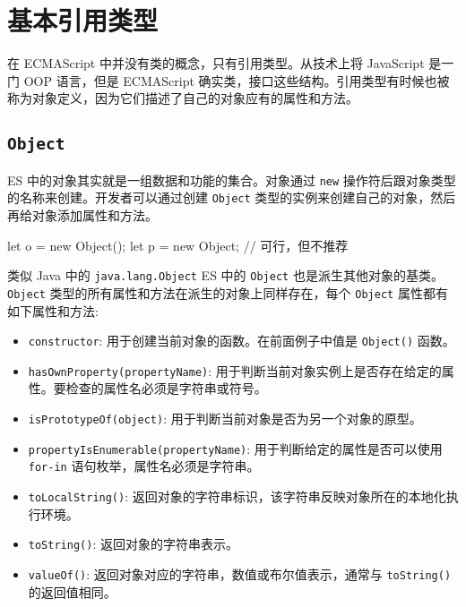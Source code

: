 \section{基本引用类型}

在 ECMAScript 中并没有类的概念，只有引用类型。从技术上将 JavaScript 是一门 OOP 语言，但是 ECMAScript 确实类，接口这些结构。引用类型有时候也被称为对象定义，因为它们描述了自己的对象应有的属性和方法。


\subsection{\texttt{Object}}

ES 中的对象其实就是一组数据和功能的集合。对象通过 \texttt{new} 操作符后跟对象类型的名称来创建。开发者可以通过创建 \texttt{Object} 类型的实例来创建自己的对象，然后再给对象添加属性和方法。

\begin{JavaScript}
let o = new Object();
let p = new Object;     // 可行，但不推荐
\end{JavaScript}

类似 Java 中的 \texttt{java.lang.Object} ES 中的 \texttt{Object} 也是派生其他对象的基类。 \texttt{Object} 类型的所有属性和方法在派生的对象上同样存在，每个 \texttt{Object} 属性都有如下属性和方法:

\begin{itemize}
    \item \texttt{constructor}: 用于创建当前对象的函数。在前面例子中值是 \texttt{Object()} 函数。
    \item \texttt{hasOwnProperty(propertyName)}: 用于判断当前对象实例上是否存在给定的属性。要检查的属性名必须是字符串或符号。
    \item \texttt{isPrototypeOf(object)}: 用于判断当前对象是否为另一个对象的原型。
    \item \texttt{propertyIsEnumerable(propertyName)}: 用于判断给定的属性是否可以使用 \texttt{for-in} 语句枚举，属性名必须是字符串。
    \item \texttt{toLocalString()}: 返回对象的字符串标识，该字符串反映对象所在的本地化执行环境。
    \item \texttt{toString()}: 返回对象的字符串表示。
    \item \texttt{valueOf()}: 返回对象对应的字符串，数值或布尔值表示，通常与 \texttt{toString()} 的返回值相同。
\end{itemize}

